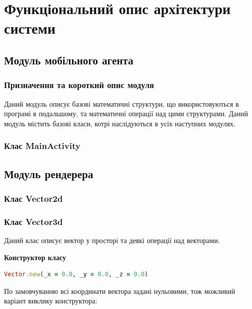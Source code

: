 \documentclass[simple,a4paper,14pt,ukrainian,utf8]{eskdtext}
\begin{document}
\newpage \section{Функціональний опис архітектури системи}

    \subsection{Модуль мобільного агента}

        \subsubsection{Призначення та короткий опис модуля}

            Даний модуль описує базові математичні структури, що використовуються в програмі в подальшому, та математичні операції над цими структурами. Даний модуль містить базові класи, котрі наслідуються в усіх наступних модулях.

        \subsubsection{Клас MainActivity}
        
     \subsection{Модуль рендерера}
     
     	\subsubsection{Клас Vector2d}
     	
    	\subsubsection{Клас Vector3d}

            Даний клас описує вектор у просторі та деякі операції над векторами.

            \textbf{Конструктор класу}

            \begin{lstlisting}[language=Ruby]
            Vector.new(_x = 0.0, _y = 0.0, _z = 0.0)
            \end{lstlisting}

            По замовчуванню всі координати вектора задані нульовими, тож можливий варіант виклику конструктора:
\end{document}
